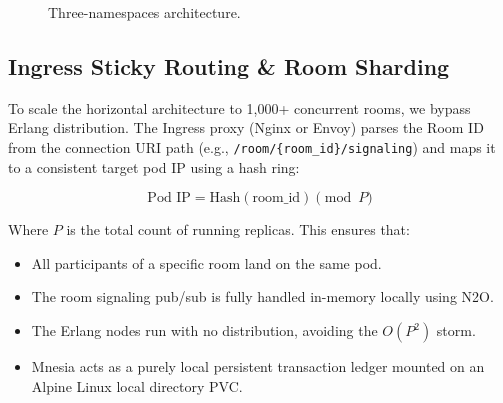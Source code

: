 \documentclass{article}
\begin{document}
\begin{figure}[htbp!]
\caption{Three-namespaces architecture.}
\label{fig:topology}
\end{figure}

\newpage
\subsection{Ingress Sticky Routing \& Room Sharding}

To scale the horizontal architecture to 1,000+ concurrent rooms, we bypass Erlang distribution.
The Ingress proxy (Nginx or Envoy) parses the Room ID from the connection URI path (e.g.,
\texttt{/room/\{room\_id\}/signaling}) and maps it to a consistent target pod IP using a hash ring:

\begin{equation}
\text{Pod IP} = \text{Hash}(\text{room\_id}) \pmod P
\end{equation}

Where $P$ is the total count of running replicas. This ensures that:

\begin{itemize}
    \item All participants of a specific room land on the same pod.
    \item The room signaling pub/sub is fully handled in-memory locally using N2O.
    \item The Erlang nodes run with no distribution, avoiding the $O(P^2)$ storm.
    \item Mnesia acts as a purely local persistent transaction ledger mounted on an Alpine Linux local directory PVC.
\end{itemize}
\end{document}
